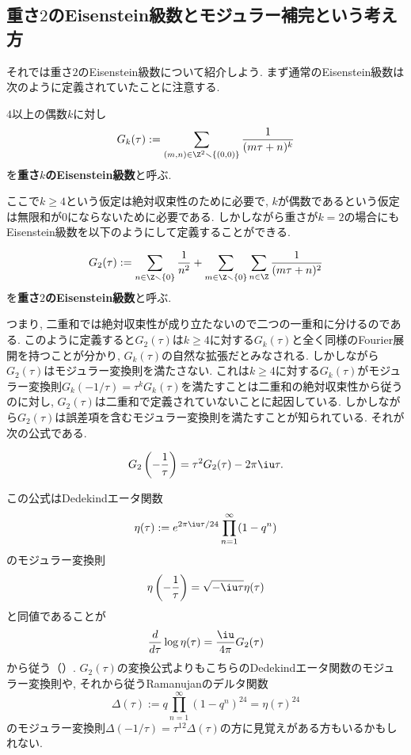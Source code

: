 \documentclass[11pt,b5paper,oneside,lualatex]{ltjsarticle} %
\numberwithin{equation}{section} %
\begin{document}

\subsection{重さ$ 2 $のEisenstein級数とモジュラー補完という考え方} \label{subsec:modular_completion}


それでは重さ$ 2 $のEisenstein級数について紹介しよう. 
まず通常のEisenstein級数は次のように定義されていたことに注意する. 

\begin{dfn}
	$ 4 $以上の偶数$ k $に対し
	\[
	G_k (\tau) := \sum_{(m, n) \in \Z^2 \smallsetminus \{ (0, 0) \}} \frac{1}{(m\tau + n)^k}
	\]
	を\textbf{重さ$ k $のEisenstein級数}と呼ぶ. 
\end{dfn}

ここで$ k \ge 4 $という仮定は絶対収束性のために必要で, $ k $が偶数であるという仮定は無限和が$ 0 $にならないために必要である. 
しかしながら重さが$ k=2 $の場合にもEisenstein級数を以下のようにして定義することができる. 

\begin{dfn}
	\[
	G_2 (\tau) := 
	\sum_{n \in \Z \smallsetminus \{ 0 \}} \frac{1}{n^2} 
	+ \sum_{m \in \Z \smallsetminus \{ 0 \}} \sum_{n \in \Z} \frac{1}{(m\tau + n)^2}
	\]
	を\textbf{重さ$ 2 $のEisenstein級数}と呼ぶ. 
\end{dfn}

つまり, 二重和では絶対収束性が成り立たないので二つの一重和に分けるのである. 
このように定義すると$ G_2 (\tau) $は$ k \ge 4 $に対する$ G_k (\tau) $と全く同様のFourier展開を持つことが分かり, $ G_k (\tau) $の自然な拡張だとみなされる. 
しかしながら$ G_2 (\tau) $はモジュラー変換則を満たさない. 
これは$ k \ge 4 $に対する$ G_k (\tau) $がモジュラー変換則$ G_k (-1/\tau) = \tau^k G_k(\tau) $を満たすことは二重和の絶対収束性から従うのに対し, $ G_2 (\tau) $は二重和で定義されていないことに起因している. 
しかしながら$ G_2 (\tau) $は誤差項を含むモジュラー変換則を満たすことが知られている. 
それが次の公式である. 

\begin{prop}
	\label{prop:G_2}
	\[
	G_2 \left( -\frac{1}{\tau} \right) = \tau^2 G_2(\tau) - 2\pi \iu \tau.
	\]
\end{prop}

\begin{rem}
	この公式はDedekindエータ関数
	\[
	\eta(\tau) := e^{2\pi\iu\tau/24}
	\prod_{n=1}^{\infty} (1-q^n)
	\]
	のモジュラー変換則
	\[
	\eta \left( -\frac{1}{\tau} \right)
	=
	\sqrt{-\iu \tau} \eta (\tau)
	\]
	と同値であることが
	\[
	\frac{d}{d\tau} \log \eta(\tau)
	=
	\frac{\iu}{4\pi} G_2(\tau)
	\]
	から従う（\cite[Proposition 1.2.5]{DS}）. 
	$ G_2 (\tau) $の変換公式よりもこちらのDedekindエータ関数のモジュラー変換則や, それから従うRamanujanのデルタ関数
	\[
	\Delta(\tau) := q \prod_{n=1}^{\infty} (1-q^n)^{24}
	= \eta(\tau)^{24}
	\]
	のモジュラー変換則$ \Delta(-1/\tau) = \tau^{12} \Delta(\tau) $の方に見覚えがある方もいるかもしれない. 
\end{rem}
\end{document}
